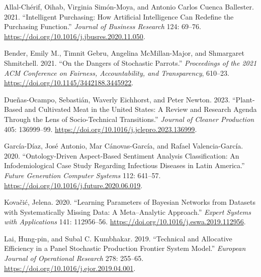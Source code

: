 \documentclass[
  12pt,
]{article}
\newlength{\cslhangindent}
\newenvironment{CSLReferences}[2] %
 {\begin{list}{}{%
  \setlength{\itemindent}{0pt}
  \setlength{\leftmargin}{0pt}
  \setlength{\parsep}{0pt}
  \ifodd #1
   \setlength{\leftmargin}{\cslhangindent}
   \setlength{\itemindent}{-1\cslhangindent}
  \fi
  \setlength{\itemsep}{#2\baselineskip}}}
 {\end{list}}
\begin{document}
\label{refs}
\begin{CSLReferences}{1}{0}
Allal-Chérif, Oihab, Virginia Simón-Moya, and Antonio Carlos Cuenca
Ballester. 2021. {``Intelligent Purchasing: How Artificial Intelligence
Can Redefine the Purchasing Function.''} \emph{Journal of Business
Research} 124: 69--76.
\url{https://doi.org/10.1016/j.jbusres.2020.11.050}.

Bender, Emily M., Timnit Gebru, Angelina McMillan-Major, and Shmargaret
Shmitchell. 2021. {``On the Dangers of Stochastic Parrots.''}
\emph{Proceedings of the 2021 ACM Conference on Fairness,
Accountability, and Transparency}, 610--23.
\url{https://doi.org/10.1145/3442188.3445922}.

Dueñas-Ocampo, Sebastián, Waverly Eichhorst, and Peter Newton. 2023.
{``Plant-Based and Cultivated Meat in the United States: A Review and
Research Agenda Through the Lens of Socio-Technical Transitions.''}
\emph{Journal of Cleaner Production} 405: 136999--99.
\url{https://doi.org/10.1016/j.jclepro.2023.136999}.

García-Díaz, José Antonio, Mar Cánovas-García, and Rafael
Valencia-García. 2020. {``Ontology-Driven Aspect-Based Sentiment
Analysis Classification: An Infodemiological Case Study Regarding
Infectious Diseases in Latin America.''} \emph{Future Generation
Computer Systems} 112: 641--57.
\url{https://doi.org/10.1016/j.future.2020.06.019}.

Kovačić, Jelena. 2020. {``Learning Parameters of Bayesian Networks from
Datasets with Systematically Missing Data: A Meta--Analytic Approach.''}
\emph{Expert Systems with Applications} 141: 112956--56.
\url{https://doi.org/10.1016/j.eswa.2019.112956}.

Lai, Hung-pin, and Subal C. Kumbhakar. 2019. {``Technical and Allocative
Efficiency in a Panel Stochastic Production Frontier System Model.''}
\emph{European Journal of Operational Research} 278: 255--65.
\url{https://doi.org/10.1016/j.ejor.2019.04.001}.

\end{CSLReferences}
\end{document}
